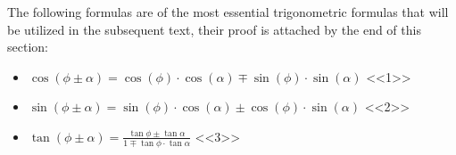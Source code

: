 The following formulas are of the most essential trigonometric formulas that 
will be utilized in the subsequent text, their proof is attached by the end of this section: 

\begin{itemize}
    \item \( \cos{(\phi \pm \alpha)} = \cos{(\phi) \cdot \cos{(\alpha)}} 
            \mp \sin{(\phi)} \cdot \sin{(\alpha)} \)    <<1>> 
    \item \( \sin{(\phi \pm \alpha)} = \sin{(\phi)} \cdot \cos{(\alpha)} 
            \pm \cos{(\phi)} \cdot \sin{(\alpha)} \)    <<2>> 
    \item \( \tan{(\phi \pm \alpha)} = \frac{\tan{\phi} \pm \tan{\alpha}}{1 \mp \tan{\phi} \cdot \tan{\alpha}} \)  <<3>>

\end{itemize}


